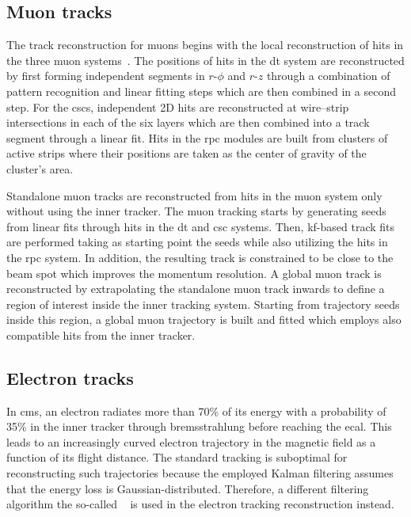\subsection{Muon tracks}
\label{sec:reconstruction-muontracks}

The track reconstruction for muons begins with the local reconstruction of hits in the three muon systems~\cite{Bayatian:922757}. The positions of hits in the \gls{dt} system are reconstructed by first forming independent segments in $r\text{-}\phi$ and $r\text{-}z$ through a combination of pattern recognition and linear fitting steps which are then combined in a second step. For the \glspl{csc}, independent 2D hits are reconstructed at wire--strip intersections in each of the six layers which are then combined into a track segment through a linear fit. Hits in the \gls{rpc} modules are built from clusters of active strips where their positions are taken as the center of gravity of the cluster's area.

Standalone muon tracks are reconstructed from hits in the muon system only without using the inner tracker. The muon tracking starts by generating seeds from linear fits through hits in the \gls{dt} and \gls{csc} systems. Then, \gls{kf}-based track fits are performed taking as starting point the seeds while also utilizing the hits in the \gls{rpc} system. In addition, the resulting track is constrained to be close to the beam spot which improves the momentum resolution. A global muon track is reconstructed by extrapolating the standalone muon track inwards to define a region of interest inside the inner tracking system. Starting from trajectory seeds inside this region, a global muon trajectory is built and fitted which employs also compatible hits from the inner tracker.


\subsection{Electron tracks}
\label{sec:reconstruction-electrontracks}

In \gls{cms}, an electron radiates more than 70\% of its energy with a probability of 35\% in the inner tracker through bremsstrahlung before reaching the \gls{ecal}. This leads to an increasingly curved electron trajectory in the magnetic field as a function of its flight distance. The standard tracking is suboptimal for reconstructing such trajectories because the employed Kalman filtering assumes that the energy loss is Gaussian-distributed. Therefore, a different filtering algorithm the so-called ~\cite{0954-3899-31-9-N01} is used in the electron tracking reconstruction instead.

